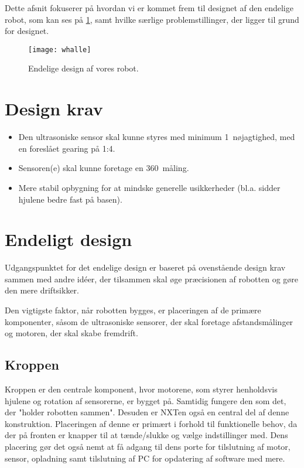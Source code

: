 Dette afsnit fokuserer på hvordan vi er kommet frem til designet af den endelige robot, som kan ses på \cref{robot:opbygning}, samt hvilke særlige problemstillinger, der ligger til grund for designet.

\begin{figure}
\centering
\texttt{[image: whalle]}
\caption{Endelige design af vores robot.}
\label{robot:opbygning}
\end{figure}

\section{Design krav}

\begin{itemize}
\item Den ultrasoniske sensor skal kunne styres med  minimum 1\degree~nøjagtighed, med en foreslået gearing på 1:4.
\item Sensoren(e) skal kunne foretage en 360\degree~måling.
\item Mere stabil opbygning for at mindske generelle usikkerheder (bl.a. sidder hjulene bedre fast på basen).
\end{itemize} 

\section{Endeligt design}
Udgangspunktet for det endelige design er baseret på ovenstående design krav sammen med andre idéer, der tilsammen skal øge præcisionen af robotten og gøre den mere driftsikker.

Den vigtigste faktor, når robotten bygges, er placeringen af de primære komponenter, såsom de ultrasoniske sensorer, der skal foretage afstandsmålinger og motoren, der skal skabe fremdrift.

\subsection{Kroppen}
Kroppen er den centrale komponent, hvor motorene, som styrer henholdsvis hjulene og rotation af sensorerne, er bygget på. 
Samtidig fungere den som det, der "holder robotten sammen".
Desuden er NXTen også en central del af denne konstruktion.
Placeringen af denne er primært i forhold til funktionelle behov, da der på fronten er knapper til at tænde/slukke og vælge indstillinger med.
Dens placering gør det også nemt at få adgang til dens porte for tilslutning af motor, sensor, opladning samt tilslutning af PC for opdatering af software med mere.

